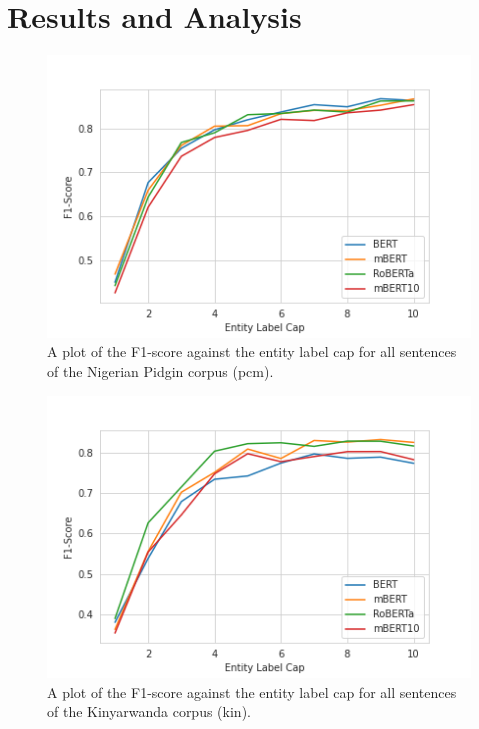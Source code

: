 \documentclass[11pt,a4paper]{article}
\begin{document}
\section{Results and Analysis}
\label{sec:res}

\begin{figure}
    \centering
    \includegraphics[width=\columnwidth]{images/pcm_models_plot.png}
    \caption{A plot of the F1-score against the entity label cap for all sentences of the Nigerian Pidgin corpus (pcm).}
    \label{fig:pcm_plot}
\end{figure}

\begin{figure}
    \centering
    \includegraphics[width=\columnwidth]{images/kin_models_plot.png}
    \caption{A plot of the F1-score against the entity label cap for all sentences of the Kinyarwanda corpus (kin).}
    \label{fig:kin_plot}
\end{figure}
\end{document}
